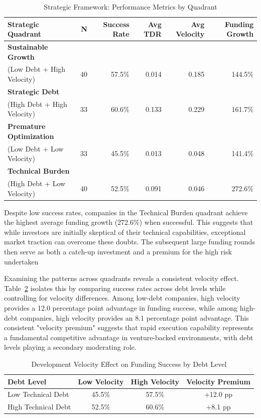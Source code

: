 \begin{table}[htbp]
\centering
\caption{Strategic Framework: Performance Metrics by Quadrant}
\label{tab:strategic_framework}
\begin{tabular}{lrrrrr}
\hline
\textbf{Strategic Quadrant} & \textbf{N} & \textbf{Success Rate} & \textbf{Avg TDR} & \textbf{Avg Velocity} & \textbf{Funding Growth} \\
\hline
\textbf{Sustainable Growth} & & & & & \\
(Low Debt + High Velocity) & 40 & 57.5\% & 0.014 & 0.185 & 144.5\% \\
\hline
\textbf{Strategic Debt} & & & & & \\
(High Debt + High Velocity) & 33 & 60.6\% & 0.133 & 0.229 & 161.7\% \\
\hline
\textbf{Premature Optimization} & & & & & \\
(Low Debt + Low Velocity) & 33 & 45.5\% & 0.013 & 0.048 & 141.4\% \\
\hline
\textbf{Technical Burden} & & & & & \\
(High Debt + Low Velocity) & 40 & 52.5\% & 0.091 & 0.046 & 272.6\% \\
\hline
\end{tabular}
\end{table}

Despite low success rates, companies in the Technical Burden quadrant achieve the highest average funding growth (272.6\%) when successful.
This suggests that while investors are initially skeptical of their technical capabilities, exceptional market traction can overcome these doubts. The subsequent large funding rounds then serve as both a catch-up investment and a premium for the high risk undertaken

Examining the patterns across quadrants reveals a consistent velocity effect. Table~\ref{tab:velocity_effect} isolates this by comparing success rates across debt levels while controlling for velocity differences. Among low-debt companies, high velocity provides a 12.0 percentage point advantage in funding success, while among high-debt companies, high velocity provides an 8.1 percentage point advantage. This consistent "velocity premium" suggests that rapid execution capability represents a fundamental competitive advantage in venture-backed environments, with debt levels playing a secondary moderating role.

\begin{table}[htbp]
\centering
\caption{Development Velocity Effect on Funding Success by Debt Level}
\label{tab:velocity_effect}
\begin{tabular}{lccc}
\hline
\textbf{Debt Level} & \textbf{Low Velocity} & \textbf{High Velocity} & \textbf{Velocity Premium} \\
\hline
Low Technical Debt  & 45.5\% & 57.5\% & +12.0 pp \\
High Technical Debt & 52.5\% & 60.6\% & +8.1 pp \\
\hline
\end{tabular}
\end{table}

